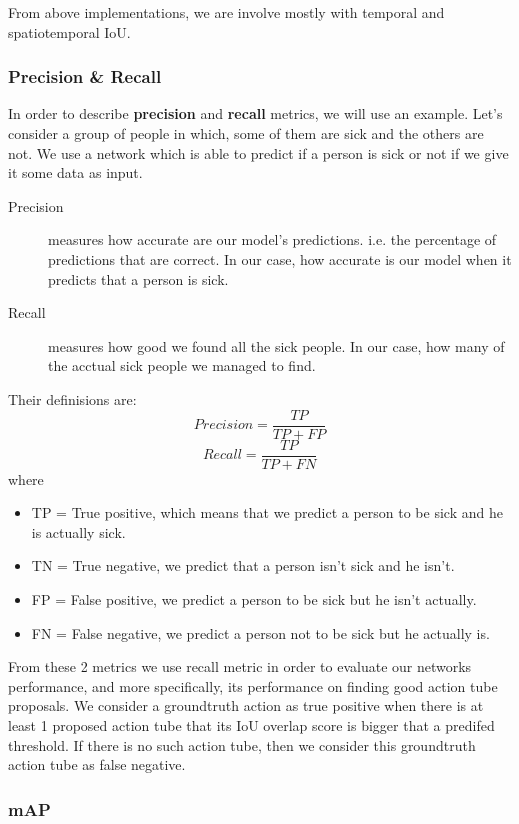 \begin{description}
\begin{enumerate}
\end{enumerate}
\end{description}
From above implementations, we are involve mostly with temporal and spatiotemporal IoU.

\subsubsection{Precision  \& Recall }

In order to describe \textbf{precision} and \textbf{recall} metrics, we will use an example. Let's consider a group of people in which, some of them are sick and
the others are not. We use a network which is able to predict if a person is sick or not if we give it some data as input.
\begin{description}
\item[ Precision ]  measures how accurate are our model's predictions. i.e. the percentage of  predictions that are correct.
  In our case, how accurate is our model when it predicts that a person is sick.
\item[ Recall ] measures how good we found all the sick people. In our case, how many of the acctual sick people we managed to find.
\end{description}
Their definisions are:
\[ Precision = \frac{TP}{TP + FP} \]  
\[  Recall = \frac{TP}{TP + FN} \] 
where \begin{itemize}
\item TP = True positive, which means that we predict a person to be sick and he is actually sick.
\item TN = True negative, we predict that a person isn't sick and he isn't.
\item FP = False positive, we predict a person to be sick but he isn't actually.
\item FN = False negative, we predict a person not to be sick but he actually is.
\end{itemize}

From these 2 metrics we use recall metric in order to evaluate our networks performance, and more specifically, its performance on finding good action tube proposals.
We consider a groundtruth action as true positive when there is at least 1 proposed action tube that its IoU overlap score is bigger that
a predifed threshold. If there is no such action tube, then we consider this groundtruth action tube as false negative.


\subsubsection{mAP }

